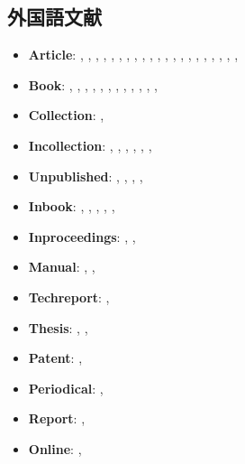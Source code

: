 \vspace{2em}

\subsection{外国語文献}

\begin{itemize}
 \item \textbf{Article}: 
       \cite{brezis93:_leap},
       \cite{ishikawa94:cje},
       \cite{Biker-2007-unemployment},
       \cite{takeda12:cce},
       \cite{takeda07:jjie},
       \cite{yamazaki13:_japan},
       \cite{takeda10:irae},
       \cite{babiker05:ej},
       \cite{yamasue09:mt},
       \cite{yamasue07:mt},
       \cite{babiker00:ep},
       \cite{parry97:ree},
       \cite{takeda19:ere},
       \cite{takeda14:eeps},
       \cite{imbens19:reas},
       \cite{attwood06:_sexed_up},
       \cite{aksin20063027},
       \cite{baez/article},
       \cite{bohringer07:ecoe},
       \cite{bohringer06:ecoe},
       \cite{krugman79:jie},
 \item \textbf{Book}:
       \cite{krugman91:_geog},
       \cite{helpman91:_int},
       \cite{fujita99:_spatial},
       \cite{ryza15:_advan},
       \cite{pearl2009Causality},
       \cite{attwood09:_mains_sex},
       \cite{attwood10:_porn},
       \cite{jones84:_hb_int},
       \cite{jones85:_hb_int},
       \cite{jones97:_hb_int},
       \cite{aristotle:poetics},
       \cite{aristotle:physics},
       \cite{aristotle:anima}
 \item \textbf{Collection}:
       \cite{westfahl:frontier},
 \item \textbf{Incollection}:
       \cite{krugman91:_bila},
       \cite{lucas76:_critique},
       \cite{DeGorter2002},
       \cite{balistreri20131513},
       \cite{westfahl:space},
       \cite{Mcconnell2005},
 \item \textbf{Unpublished}:
       \cite{ishikawa03:_ghg},
       \cite{rutherford00:_gtap},
       \cite{takeda15:_lab},
       \cite{babiker99:_kyoto},
 \item \textbf{Inbook}:
       \cite{wong95:_int},
       \cite{milne-thomson68:_theor},
       \cite{kant:kpv},
       \cite{kant:ku},
       \cite{nietzsche:historie},
 \item \textbf{Inproceedings}:
       \cite{wang89:_model},
       \cite{zhang2016Deep},
 \item \textbf{Manual}:
       \cite{brooke03:_gams},
       \cite{cms},
 \item \textbf{Techreport}:
       \cite{Peri2007},
 \item \textbf{Thesis}:
       \cite{krugman77:_essay},
       \cite{loh},
 \item \textbf{Patent}:
       \cite{sorace},
 \item \textbf{Periodical}:
       \cite{jcg},
 \item \textbf{Report}:
       \cite{chiu},
 \item \textbf{Online}:
       \cite{ctan},
\end{itemize}

